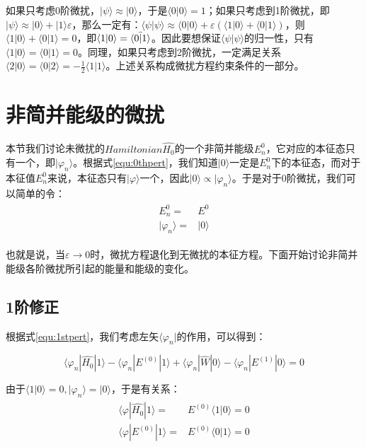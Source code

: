             如果只考虑0阶微扰，$|\psi\rangle \approx|0\rangle$，于是$\langle0|0\rangle=1$；如果只考虑到1阶微扰，即$|\psi\rangle \approx|0\rangle+|1\rangle\varepsilon$，那么一定有：$\langle \psi|\psi\rangle\approx\langle0|0\rangle+\varepsilon(\langle1|0\rangle+\langle0|1\rangle)$，则$\langle1|0\rangle+\langle0|1\rangle=0$，即$\langle1|0\rangle=\Bar{\langle0|1\rangle}$。因此要想保证$\langle \psi|\psi \rangle$的归一性，只有$\langle1|0\rangle=\langle0|1\rangle=0$。同理，如果只考虑到2阶微扰，一定满足关系$\langle2|0\rangle=\langle0|2\rangle=-\frac{1}{2}\langle1|1\rangle$。上述关系构成微扰方程约束条件的一部分。
\section{非简并能级的微扰}
本节我们讨论未微扰的$Hamiltonian \hat{H_0}$的一个非简并能级$E^0_n$，它对应的本征态只有一个，即$|\varphi_n\rangle$。根据式\eqref{equ:0thpert}，我们知道$|0\rangle$一定是$E_n^0$下的本征态，而对于本征值$E_n^0$来说，本征态只有$|\varphi\rangle$一个，因此$|0\rangle\propto |\varphi_n\rangle$。于是对于0阶微扰，我们可以简单的令：
    \begin{align}
        \begin{split}
            E^0_n=&E^{0}\\
            |\varphi_n \rangle=&|0\rangle
        \end{split}
    \end{align}
    
也就是说，当$\varepsilon\rightarrow0$时，微扰方程退化到无微扰的本征方程。下面开始讨论非简并能级各阶微扰所引起的能量和能级的变化。
      \subsection{1阶修正}  
        根据式\eqref{equ:1stpert}，我们考虑左矢$\langle\varphi_n|$的作用，可以得到：
        
        \begin{equation} \label{equ:1stpert_E}
             \langle\varphi_n|\hat{H_0}|1\rangle-\langle\varphi_n|E^{(0)}|1\rangle+\langle\varphi_n|\hat{W}|0\rangle-\langle\varphi_n|E^{(1)}|0\rangle=0 
        \end{equation}

        由于$\langle1|0\rangle=0,|\varphi_n\rangle=|0\rangle$，于是有关系：
        \begin{align}
            \begin{split}
                \langle \varphi| \hat{H_0}|1\rangle=&E^{(0)}\langle1|0\rangle=0\\
               \langle \varphi|E^{(0)}|1\rangle=& E^{(0)}\langle 0|1\rangle=0
            \end{split}
        \end{align}
        
